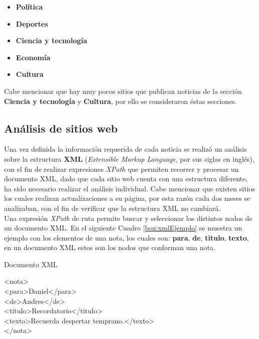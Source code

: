 \begin{itemize}
    \item \textbf{Política}
    \item \textbf{Deportes}
    \item \textbf{Ciencia y tecnología}
    \item \textbf{Economía}
    \item \textbf{Cultura}
\end{itemize}

Cabe mencionar que hay muy pocos sitios que publican noticias de la sección \textbf{Ciencia y tecnología} y \textbf{Cultura}, por ello se consideraron éstas secciones.

\subsection{Análisis de sitios web}

Una vez definida la información requerida de cada noticia se realizó un análisis sobre la estructura \textbf{XML} (\textit{Extensible Markup Language}, por sus siglas en inglés), con el fin de realizar expresiones \textit{XPath} que permiten recorrer y procesar un documento XML, dado que cada sitio web cuenta con una estructura diferente, ha sido necesario realizar el análisis individual. Cabe mencionar que existen sitios los cuales realizan actualizaciones a su página, por esta razón cada dos meses se analizaban, con el fin de verificar que la estructura XML no cambiará.\\

Una expresión \textit{XPath} de ruta permite buscar y seleccionar los distintos nodos de un documento XML. En el siguiente Cuadro \ref{box:xmlEjemplo} se muestra un ejemplo con los elementos de una nota, los cuales son: \textbf{para}, \textbf{de}, \textbf{titulo}, \textbf{texto}, en un documento XML estos son los nodos que conforman una nota.\\

\begin{mygraybox}[label={box:xmlEjemplo}]{Documento XML}
\begin{tabbing}
<nota> \= \\\kill
\>	<para>Daniel</para>\\
\>	<de>Andres</de>\\
\>	<titulo>Recordatorio</titulo>\\
\>	<texto>Recuerda despertar temprano.</texto>\\
</nota>
\end{tabbing}
\end{mygraybox}

